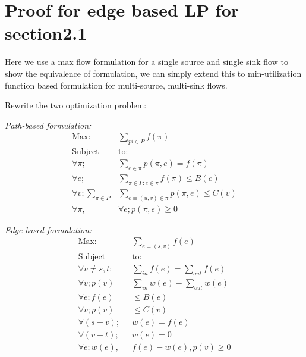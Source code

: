 \appendix
\section{Proof for edge based LP for section2.1}

Here we use a max flow formulation for a single source and single sink flow to show the equivalence of formulation, we can simply extend this to min-utilization function based formulation for multi-source, multi-sink flows. 

Rewrite the two optimization problem:


\begin{minipage}[t]{0.45\textwidth}
\textit{Path-based formulation:}
  \begin{subequations}
\begin{align}
\text{Max:}& \sum\limits_{pi\in P}f(\pi) \\  \nonumber
\text{Subject } &\text{to:} \\
\forall \pi; &\sum \limits_{e\in \pi} p(\pi, e) = f(\pi)\\
\forall e;& \sum \limits_{\pi\in P:e\in \pi} f(\pi) \leq B(e)\\
\forall v; \sum \limits_{\pi\in P} &\sum \limits_{ e\equiv (u,v)\in \pi} p(\pi, e) \leq C(v)\\
\forall \pi,&\forall e;p(\pi,e) \geq 0
\end{align}
\end{subequations}
  \end{minipage}
\hspace{0.1cm}
\begin{minipage}[t]{0.50\textwidth}
\textit{Edge-based formulation:}
  \begin{subequations}
\begin{align}
\text{Max:}&\sum \limits_{e=(s,v)} f(e)  \\ \nonumber
\text{Subject } &\text{to:}\\
\forall v \not= s,t;& \sum\limits_{in}  f(e)=  \sum\limits_{out} f(e)\\
\forall v ;p (v) =&  \sum\limits_{in} w (e) - \sum\limits_{out} w (e) \\
\forall e;  f(e)& \leq B(e)\\
\forall v;  p(v)& \leq C(v)\\
\forall (s-v);& w (e)= f (e)\\
\forall (v-t);& w (e)= 0\\
\forall e;w (e),& f (e)-w (e), p (v) \geq 0
\end{align}
\end{subequations}
\end{minipage}

